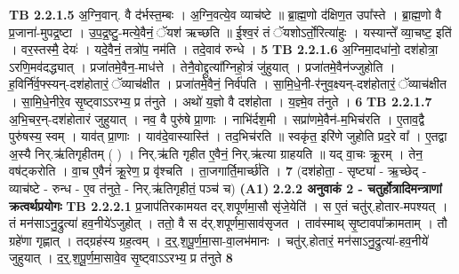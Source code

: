 \documentclass[17pt]{extarticle}
\begin{document}
                                \textbf{ TB 2.2.1.5} \newline
                  अ॒ग्नि॒वान्. वै द॑र्भस्त॒म्बः । अ॒ग्नि॒वत्ये॒व व्याच॑ष्टे ॥ ब्रा॒ह्म॒णो द॑क्षिण॒त उपा᳚स्ते । ब्रा॒ह्म॒णो वै प्र॒जाना॑-मुपद्र॒ष्टा । उ॒प॒द्र॒ष्टु॒-मत्ये॒वैनं॒ ॅयश॑ ऋच्छति ॥ ई॒श्व॒रं तं ॅयशोऽर्तो॒रित्या॑हुः । यस्यान्ते᳚ व्या॒चष्ट॒ इति॑ । वर॒स्तस्मै॒ देयः॑ । यदे॒वैनं॒ तत्रो॑प॒ नम॑ति । तदे॒वाव॑ रुन्धे । \textbf{ 5} \newline
                  \newline
                                \textbf{ TB 2.2.1.6} \newline
                  अ॒ग्निमा॒दधा॑नो॒ दश॑होत्रा॒ ऽरणि॒मव॑दद्ध्यात् । प्रजा॑तमे॒वैन॒-माध॑त्ते । तेनै॒वोद्द्रुत्या᳚ग्निहो॒त्रं जु॑हुयात् । प्रजा॑तमे॒वैन॑ज्जुहोति । ह॒विर्नि॑र्व॒फ्स्यन्-दश॑होतारं॒ ॅव्याच॑क्षीत । प्रजा॑तमे॒वैनं॒ निर्व॑पति । सा॒मि॒धे॒नी-र॑नुव॒क्ष्यन्-दश॑होतारं॒ ॅव्याच॑क्षीत । सा॒मि॒धे॒नीरे॒व सृ॒ष्ट्वाऽऽरभ्य॒ प्र त॑नुते । अथो॑ य॒ज्ञो वै दश॑होता । य॒ज्ञ्मे॒व त॑नुते । \textbf{ 6} \newline
                  \newline
                                \textbf{ TB 2.2.1.7} \newline
                  अ॒भि॒चर॒न्-दश॑होतारं जुहुयात् । नव॒ वै पुरु॑षे प्रा॒णाः । नाभि॑र्दश॒मी । सप्रा॑णमे॒वैन॑-म॒भिच॑रति । ए॒ताव॒द्वै पुरु॑षस्य॒ स्वम् । याव॑त् प्रा॒णाः । याव॑दे॒वास्यास्ति॑ । तद॒भिच॑रति ॥ स्वकृ॑त॒ इरि॑णे जुहोति प्रद॒रे वा᳚ । ए॒तद्वा अ॒स्यै निर्.ऋ॑तिगृहीतम् ( ) । निर्.ऋ॑ति गृहीत ए॒वैनं॒ निर्.ऋ॑त्या ग्राहयति ॥ यद् वा॒चः क्रू॒रम् । तेन॒ वष॑ट्करोति । वा॒च ए॒वैनं॑ क्रू॒रेण॒ प्र वृ॑श्चति । ता॒जगार्ति॒मार्च्छ॑ति । \textbf{ 7} \newline
                  \newline
                                    (दश॑होता॒ - सृष्ट्या॑ - ऋ॒च्छेद् - व्याच॑ष्टे - रुन्ध - ए॒व त॑नुते॒ - निर्.ऋ॑तिगृहीतं॒ पञ्च॑ च) \textbf{(A1)} \newline \newline
                \textbf{ 2.2.2      अनुवाकं   2 - चतुर्होत्रादिमन्त्राणां क्रत्वर्थप्रयोगः} \newline
                                \textbf{ TB 2.2.2.1} \newline
                  प्र॒जाप॑तिरकामयत दर्.शपूर्णमा॒सौ सृ॑जे॒येति॑ । स ए॒तं चतु॑र्.होतार-मपश्यत् । तं मन॑साऽनु॒द्रुत्या॑ हव॒नीये॑ऽजुहोत् । ततो॒ वै स द॑र्.शपूर्णमा॒साव॑सृजत । ताव॑स्माथ् सृ॒ष्टावपा᳚क्रामताम् । तौ ग्रहे॑णा गृह्णात् । तद्ग्रह॑स्य ग्रह॒त्वम् । द॒र्॒.श॒पू॒र्ण॒मा॒सा-वा॒लभ॑मानः । चतु॑र्.होतारं॒ मन॑साऽनु॒द्रुत्या॑-हव॒नीये॑ जुहुयात् । द॒र्॒.श॒पू॒र्ण॒मा॒सावे॒व सृ॒ष्ट्वाऽऽरभ्य॒ प्र त॑नुते \textbf{ 8} \newline
\end{document}
